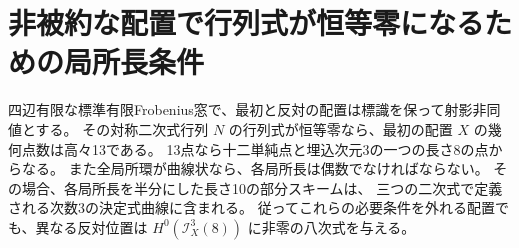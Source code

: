 \section{非被約な配置で行列式が恒等零になるための局所長条件}
\label{sec:singular-opposite-root-lengths}
\begin{theorem}\label{thm:singular-opposite-root-lengths}
四辺有限な標準有限Frobenius窓で、最初と反対の配置は標識を保って射影非同値とする。
その対称二次式行列 $N$ の行列式が恒等零なら、最初の配置 $X$ の幾何点数は高々13である。
13点なら十二単純点と埋込次元3の一つの長さ8の点からなる。
また全局所環が曲線状なら、各局所長は偶数でなければならない。
その場合、各局所長を半分にした長さ10の部分スキームは、
三つの二次式で定義される次数3の決定式曲線に含まれる。
従ってこれらの必要条件を外れる配置でも、異なる反対位置は
$H^0(\mathcal I_X^3(8))$ に非零の八次式を与える。
\end{theorem}
